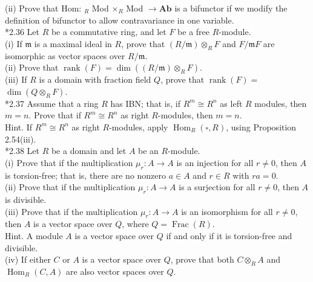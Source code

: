 \documentclass[10pt, letterpaper]{article}
\begin{document}
(ii) Prove that Hom: ${ }_{R}$ Mod $\times{ }_{R}$ Mod $\rightarrow \mathbf{A b}$ is a bifunctor if we modify the definition of bifunctor to allow contravariance in one variable.\\
*2.36 Let $R$ be a commutative ring, and let $F$ be a free $R$-module.\\
(i) If $\mathfrak{m}$ is a maximal ideal in $R$, prove that $(R / \mathfrak{m}) \otimes_{R} F$ and $F / \mathfrak{m} F$ are isomorphic as vector spaces over $R / \mathfrak{m}$.\\
(ii) Prove that $\operatorname{rank}(F)=\operatorname{dim}\left((R / \mathfrak{m}) \otimes_{R} F\right)$.\\
(iii) If $R$ is a domain with fraction field $Q$, prove that $\operatorname{rank}(F)=$ $\operatorname{dim}\left(Q \otimes_{R} F\right)$.\\
*2.37 Assume that a ring $R$ has IBN; that is, if $R^{m} \cong R^{n}$ as left $R$ modules, then $m=n$. Prove that if $R^{m} \cong R^{n}$ as right $R$-modules, then $m=n$.\\
Hint. If $R^{m} \cong R^{n}$ as right $R$-modules, apply $\operatorname{Hom}_{R}(\square, R)$, using Proposition 2.54(iii).\\
*2.38 Let $R$ be a domain and let $A$ be an $R$-module.\\
(i) Prove that if the multiplication $\mu_{r}: A \rightarrow A$ is an injection for all $r \neq 0$, then $A$ is torsion-free; that is, there are no nonzero $a \in A$ and $r \in R$ with $r a=0$.\\
(ii) Prove that if the multiplication $\mu_{r}: A \rightarrow A$ is a surjection for all $r \neq 0$, then $A$ is divisible.\\
(iii) Prove that if the multiplication $\mu_{r}: A \rightarrow A$ is an isomorphism for all $r \neq 0$, then $A$ is a vector space over $Q$, where $Q=\operatorname{Frac}(R)$.\\
Hint. A module $A$ is a vector space over $Q$ if and only if it is torsion-free and divisible.\\
(iv) If either $C$ or $A$ is a vector space over $Q$, prove that both $C \otimes_{R} A$ and $\operatorname{Hom}_{R}(C, A)$ are also vector spaces over $Q$.
\end{document}
